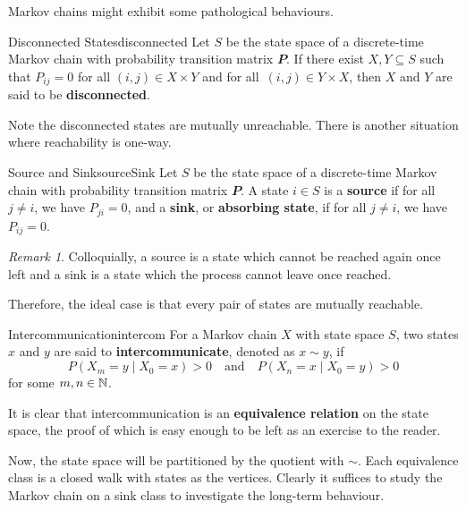 \documentclass[math, code]{amznotes}
\theoremstyle{remark}
\newtheorem*{remark}{Remark}
\begin{document}
Markov chains might exhibit some pathological behaviours.
\begin{dfnbox}{Disconnected States}{disconnected}
    Let $S$ be the state space of a discrete-time Markov chain with probability transition matrix $\mathbfit{P}$. If there exist $X, Y \subseteq S$ such that $P_{ij} = 0$ for all $\left(i, j\right) \in X \times Y$ and for all~$\left(i, j\right) \in Y \times X$, then $X$ and $Y$ are said to be {\color{red} \textbf{disconnected}}. 
\end{dfnbox}
Note the disconnected states are mutually unreachable. There is another situation where reachability is one-way.
\begin{dfnbox}{Source and Sink}{sourceSink}
    Let $S$ be the state space of a discrete-time Markov chain with probability transition matrix $\mathbfit{P}$. A state $i \in S$ is a {\color{red} \textbf{source}} if for all $j \neq i$, we have $P_{ji} = 0$, and a {\color{red} \textbf{sink}}, or {\color{red} \textbf{absorbing state}}, if for all $j \neq i$, we have $P_{ij} = 0$.
\end{dfnbox}
\begin{notebox}
    \begin{remark}
        Colloquially, a source is a state which cannot be reached again once left and a sink is a state which the process cannot leave once reached.
    \end{remark}
\end{notebox}
Therefore, the ideal case is that every pair of states are mutually reachable.
\begin{dfnbox}{Intercommunication}{intercom}
    For a Markov chain $X$ with state space $S$, two states $x$ and $y$ are said to {\color{red} \textbf{intercommunicate}}, denoted as $x \sim y$, if 
    \begin{equation*}
        P\left(X_m = y \mid X_0 = x\right) > 0 \quad\textrm{and}\quad P\left(X_n = x \mid X_0 = y\right) > 0
    \end{equation*}
    for some $m, n \in \mathbb{N}$.
\end{dfnbox}
It is clear that intercommunication is an \textbf{equivalence relation} on the state space, the proof of which is easy enough to be left as an exercise to the reader. 

Now, the state space will be partitioned by the quotient with $\sim$. Each equivalence class is a closed walk with states as the vertices. Clearly it suffices to study the Markov chain on a sink class to investigate the long-term behaviour.
\end{document}
